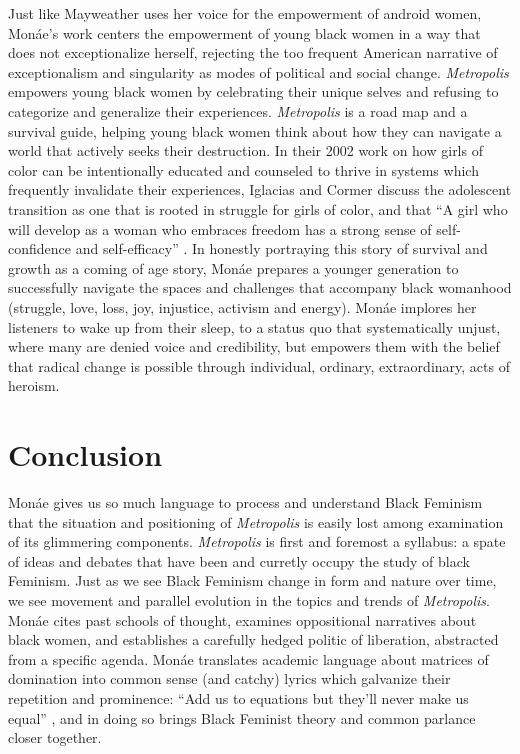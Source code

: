 \documentclass[a4paper, 11pt]{article} %
\begin{document}
Just like Mayweather uses her voice for the empowerment of android women, Mon\'ae's work centers the empowerment of young black women in a way that does not exceptionalize herself, rejecting the too frequent American narrative of exceptionalism and singularity as modes of political and social change. 
\emph{Metropolis} empowers young black women by celebrating their unique selves and refusing to categorize and generalize their experiences. 
\emph{Metropolis} is a road map and a survival guide, helping young black women think about how they can navigate a world that actively seeks their destruction.
In their 2002 work on how girls of color can be intentionally educated and counseled to thrive in systems which frequently invalidate their experiences, Iglacias and Cormer discuss the adolescent transition as one that is rooted in struggle for girls of color, and that ``A girl who will develop as a woman who embraces freedom has a strong sense of self-confidence and self-efficacy'' \cite{iglesiascormier}.
In honestly portraying this story of survival and growth as a coming of age story, Mon\'ae prepares a younger generation to successfully navigate the spaces and challenges that accompany black womanhood (struggle, love, loss, joy, injustice, activism and energy).
Mon\'ae implores her listeners to wake up from their sleep, to a status quo that systematically unjust, where many are denied voice and credibility, but empowers them with the belief that radical change is possible through individual, ordinary, extraordinary, acts of heroism.


\section*{Conclusion}

Mon\'ae gives us so much language to process and understand Black Feminism that the situation and positioning of \emph{Metropolis} is easily lost among examination of its glimmering components.
\emph{Metropolis} is first and foremost a syllabus: a spate of ideas and debates that have been and curretly occupy the study of black Feminism.
Just as we see Black Feminism change in form and nature over time, we see movement and parallel evolution in the topics and trends of \emph{Metropolis}.
Mon\'ae cites past schools of thought, examines oppositional narratives about black women, and establishes a carefully hedged politic of liberation, abstracted from a specific agenda. 
Mon\'ae translates academic language about matrices of domination into common sense (and catchy) lyrics which galvanize their repetition and prominence: ``Add us to equations but they'll never make us equal'' \cite{queen}, and in doing so brings Black Feminist theory and common parlance closer together.
\end{document}
